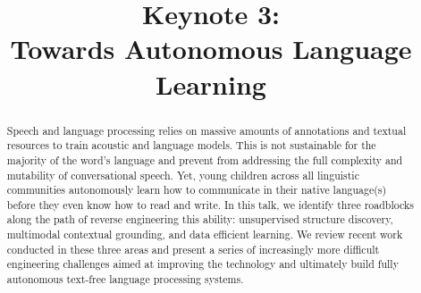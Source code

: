 \documentclass{article}
\title{Keynote 3:\\Towards Autonomous Language Learning}
\begin{document}
\maketitle
\thispagestyle{empty}
\begin{abstract}
Speech and language processing relies on massive amounts of annotations and textual resources to train acoustic and language models. This is not sustainable for the majority of the word's language and prevent from addressing the full complexity and mutability of conversational speech. Yet, young children across all linguistic communities autonomously learn how to communicate in their native language(s) before they even know how to read and write. In this talk, we identify three roadblocks along the path of reverse engineering this ability: unsupervised structure discovery, multimodal contextual grounding, and data efficient learning. We review recent work conducted in these three areas and present a series of increasingly more difficult engineering challenges aimed at improving the technology and ultimately build fully autonomous text-free language processing systems.
\end{abstract}
\vfill{}
\end{document}
